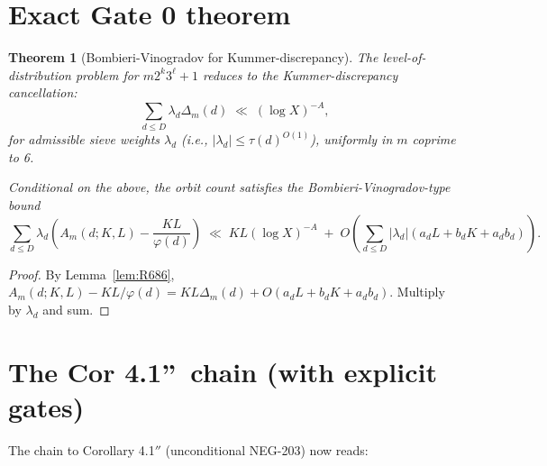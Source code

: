 \documentclass[12pt]{amsart}
\newtheorem{theorem}{Theorem}
\theoremstyle{definition}
\theoremstyle{remark}
\begin{document}
\section{Exact Gate 0 theorem}

\begin{theorem}[Bombieri-Vinogradov for Kummer-discrepancy]\label{thm:BV-Kummer}
The level-of-distribution problem for $m 2^k 3^\ell + 1$ reduces to the
Kummer-discrepancy cancellation:
$$
\sum_{d \le D} \lambda_d \Delta_m(d)
\;\ll\;
(\log X)^{-A},
$$
for admissible sieve weights $\lambda_d$ (i.e., $|\lambda_d| \le \tau(d)^{O(1)}$),
uniformly in $m$ coprime to 6.

Conditional on the above, the orbit count satisfies the Bombieri-Vinogradov-type bound
$$
\sum_{d \le D} \lambda_d \left( A_m(d; K, L) - \frac{KL}{\varphi(d)} \right)
\;\ll\;
KL (\log X)^{-A}
\;+\;
O\!\left( \sum_{d \le D} |\lambda_d| (a_d L + b_d K + a_d b_d) \right).
$$
\end{theorem}

\begin{proof}
By Lemma~\ref{lem:R686},
$A_m(d; K, L) - KL/\varphi(d) = KL \Delta_m(d) + O(a_d L + b_d K + a_d b_d)$. Multiply by $\lambda_d$ and sum.
\end{proof}

\section{The Cor 4.1\textquotedblright\ chain (with explicit gates)}

The chain to Corollary 4.1$''$ (unconditional NEG-203) now reads:
\end{document}
